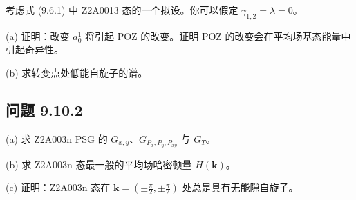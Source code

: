 考虑式 (9.6.1) 中 Z2A0013 态的一个拟设。你可以假定 $\gamma_{1,2}=\lambda=0$。

(a) 证明：改变 $a_{0}^{1}$ 将引起 POZ 的改变。证明 POZ 的改变会在平均场基态能量中引起奇异性。

(b) 求转变点处低能自旋子的谱。

\subsection*{问题 9.10.2}

(a) 求 Z2A003n PSG 的 $G_{x,y}$、$G_{P_{x},P_{y},P_{xy}}$ 与 $G_{T}$。

(b) 求 Z2A003n 态最一般的平均场哈密顿量 $H(\pmb{k})$。

(c) 证明：Z2A003n 态在 $\pmb{k}=(\pm\frac{\pi}{2},\pm\frac{\pi}{2})$ 处总是具有无能隙自旋子。

